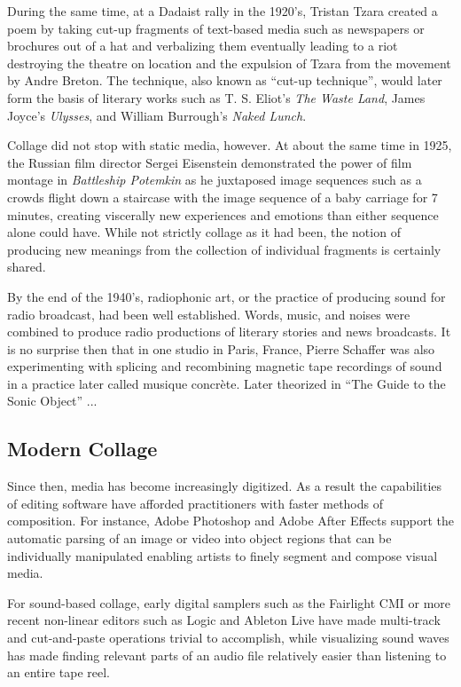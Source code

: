 During the same time, at a Dadaist rally in the 1920's, Tristan Tzara created a poem by taking cut-up fragments of text-based media such as newspapers or brochures out of a hat and verbalizing them eventually leading to a riot destroying the theatre on location and the expulsion of Tzara from the movement by Andre Breton.  The technique, also known as ``cut-up technique'', would later form the basis of literary works such as T. S. Eliot's \textit{The Waste Land}, James Joyce's \textit{Ulysses}, and William Burrough's \textit{Naked Lunch}.

Collage did not stop with static media, however.  At about the same time in 1925, the Russian film director Sergei Eisenstein demonstrated the power of film montage in \textit{Battleship Potemkin} as he juxtaposed image sequences such as a crowds flight down a staircase with the image sequence of a baby carriage for 7 minutes, creating viscerally new experiences and emotions than either sequence alone could have.  While not strictly collage as it had been, the notion of producing new meanings from the collection of individual fragments is certainly shared.  

By the end of the 1940's, radiophonic art, or the practice of producing sound for radio broadcast, had been well established.  Words, music, and noises were combined to produce radio productions of literary stories and news broadcasts.  It is no surprise then that in one studio in Paris, France, Pierre Schaffer was also experimenting with splicing and recombining magnetic tape recordings of sound in a practice later called musique concr\`ete.  Later theorized in ``The Guide to the Sonic Object'' ...

\subsection{Modern Collage}
Since then, media has become increasingly digitized.  As a result the capabilities of editing software have afforded practitioners with faster methods of composition.  For instance, Adobe Photoshop and Adobe After Effects support the automatic parsing of an image or video into object regions that can be individually manipulated enabling artists to finely segment and compose visual media.  

For sound-based collage, early digital samplers such as the Fairlight CMI or more recent non-linear editors such as Logic and Ableton Live have made multi-track and cut-and-paste operations trivial to accomplish, while visualizing sound waves has made finding relevant parts of an audio file relatively easier than listening to an entire tape reel.  


